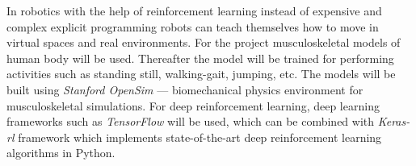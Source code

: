 
In robotics with the help of reinforcement learning instead of expensive and
complex explicit programming robots can teach themselves how to move in virtual
spaces and real environments. For the project musculoskeletal models of human
body will be used. Thereafter the model will be trained for performing
activities such as standing still, walking-gait, jumping, etc. The models will
be built using \emph{Stanford OpenSim} --- biomechanical physics environment for
musculoskeletal simulations. For deep reinforcement learning, deep learning
frameworks such as \emph{TensorFlow} \cite{abadi2016tensorflow} will be used,
which can be combined with \emph{Keras-rl} \cite{plappert2016kerasrl} framework
which implements state-of-the-art deep reinforcement learning algorithms in
Python.
